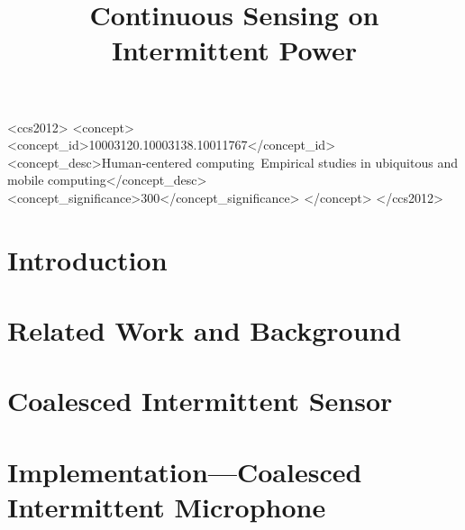 \documentclass[sigconf, anonymous]{acmart}
\begin{document}
\title{Continuous Sensing on Intermittent Power} 


\renewcommand{\shortauthors}{A. Majid et al.}


\begin{abstract}

\end{abstract}

\begin{CCSXML}
<ccs2012>
<concept>
<concept_id>10003120.10003138.10011767</concept_id>
<concept_desc>Human-centered computing~Empirical studies in ubiquitous and mobile computing</concept_desc>
<concept_significance>300</concept_significance>
</concept>
</ccs2012>
\end{CCSXML}


\maketitle


\section{Introduction}
\label{sec:introduction}


\section{Related Work and Background}
\label{sec:relatedwork}

%

\section{Coalesced Intermittent Sensor}
\label{sec:coalInterSen}


\section{Implementation---Coalesced Intermittent Microphone}
\label{sec:disMic}

\end{document}
